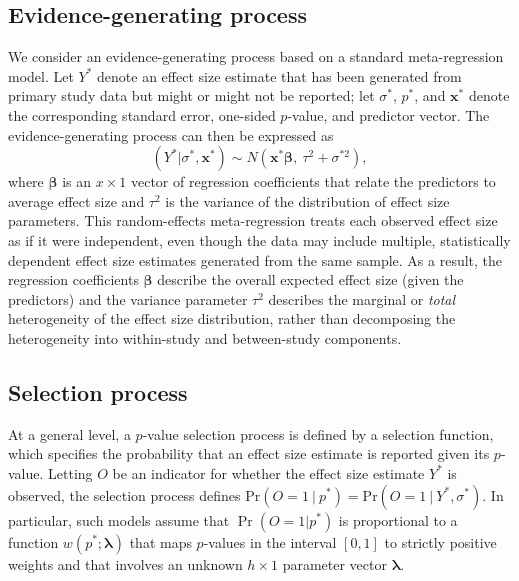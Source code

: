 \documentclass[
  man, donotrepeattitle,floatsintext]{apa7}
\begin{document}
\subsection{Evidence-generating process}\label{evidence-generating-process}

We consider an evidence-generating process based on a standard meta-regression model.
Let \(Y^*\) denote an effect size estimate that has been generated from primary study data but might or might not be reported; let \(\sigma^*\), \(p^*\), and \(\mathbf{x}^*\) denote the corresponding standard error, one-sided \(p\)-value, and predictor vector.
The evidence-generating process can then be expressed as
\begin{equation}
\label{eq:meta-mean-regression}
\left(Y^* | \sigma^*, \mathbf{x}^*\right) \sim N\left(\mathbf{x}^* \boldsymbol\beta, \ \tau^2 + \sigma^{*2}\right),
\end{equation}
where \(\boldsymbol\beta\) is an \(x \times 1\) vector of regression coefficients that relate the predictors to average effect size and \(\tau^2\) is the variance of the distribution of effect size parameters.
This random-effects meta-regression treats each observed effect size as if it were independent, even though the data may include multiple, statistically dependent effect size estimates generated from the same sample.
As a result, the regression coefficients \(\boldsymbol\beta\) describe the overall expected effect size (given the predictors) and the variance parameter \(\tau^2\) describes the marginal or \emph{total} heterogeneity of the effect size distribution, rather than decomposing the heterogeneity into within-study and between-study components.

\subsection{Selection process}\label{selection-process}

At a general level, a \(p\)-value selection process is defined by a selection function, which specifies the probability that an effect size estimate is reported given its \(p\)-value.
Letting \(O\) be an indicator for whether the effect size estimate \(Y^*\) is observed, the selection process defines \(\text{Pr}(O = 1 \ | \ p^*) = \text{Pr}(O = 1 \ | \ Y^*, \sigma^*)\).
In particular, such models assume that
\(\Pr\left(O = 1 | p^* \right)\) is proportional to a function \(w\left(p^*; \boldsymbol\lambda \right)\) that maps \(p\)-values in the interval \([0,1]\) to strictly positive weights and that involves an unknown \(h \times 1\) parameter vector \(\boldsymbol\lambda\).
\end{document}
